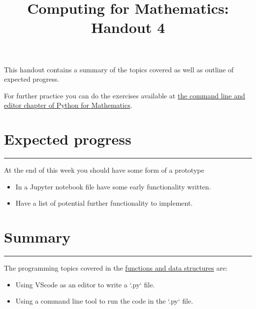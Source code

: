\documentclass{article}
\title{Computing for Mathematics: Handout 4}
\date{}
\begin{document}
\maketitle


This handout contains a summary of the topics covered as well as outline of
expected progress.

For further practice you can do the exercises available at 
\href{https://vknight.org/pfm/building-tools/04-editor-and-cli/exercises/main.html}{the
command line and editor chapter of Python for Mathematics}.

\section{Expected progress}
\hrule

At the end of this week you should have some form of a prototype

\begin{itemize}
    \item In a Jupyter notebook file have some early functionality written.
    \item Have a list of potential further functionality to implement.
\end{itemize}

\begin{center}
\end{center}

\section{Summary}\label{summary}
\hrule

The programming topics covered in the
\href{https://vknight.org/pfm/building-tools/04-editor-and-cli/introduction/main.html}{functions
and data structures} are:


\begin{itemize}
\item
  Using VScode as an editor to write a `.py` file.
  \item Using a command line tool to run the code in the `.py` file.
\end{itemize}
\end{document}

